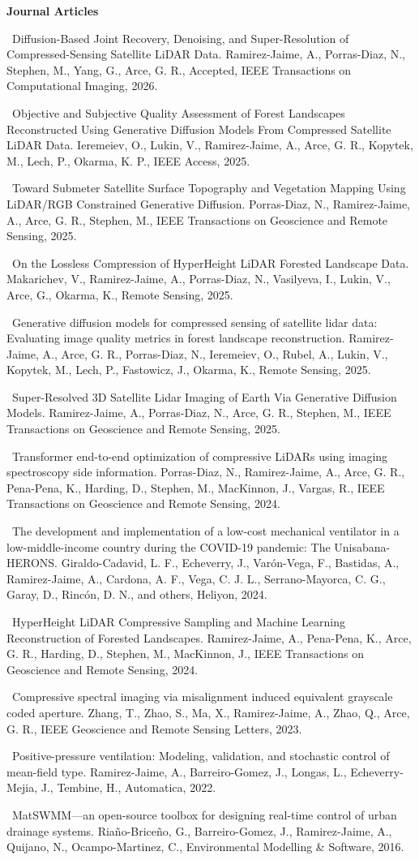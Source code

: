 \documentclass[letterpaper,10pt]{article}
\newcommand{\resumeItem}[1]{\item\small{#1}}
\begin{document}
  \textbf{Journal Articles}
  \resumeItem{\textbullet\ Diffusion-Based Joint Recovery, Denoising, and Super-Resolution of Compressed-Sensing Satellite LiDAR Data. Ramirez-Jaime, A., Porras-Diaz, N., Stephen, M., Yang, G., Arce, G. R., Accepted, IEEE Transactions on Computational Imaging, 2026.}
  \resumeItem{\textbullet\ Objective and Subjective Quality Assessment of Forest Landscapes Reconstructed Using Generative Diffusion Models From Compressed Satellite LiDAR Data. Ieremeiev, O., Lukin, V., Ramirez-Jaime, A., Arce, G. R., Kopytek, M., Lech, P., Okarma, K. P., IEEE Access, 2025.}
  \resumeItem{\textbullet\ Toward Submeter Satellite Surface Topography and Vegetation Mapping Using LiDAR/RGB Constrained Generative Diffusion. Porras-Diaz, N., Ramirez-Jaime, A., Arce, G. R., Stephen, M., IEEE Transactions on Geoscience and Remote Sensing, 2025.}
  \resumeItem{\textbullet\ On the Lossless Compression of HyperHeight LiDAR Forested Landscape Data. Makarichev, V., Ramirez-Jaime, A., Porras-Diaz, N., Vasilyeva, I., Lukin, V., Arce, G., Okarma, K., Remote Sensing, 2025.}
  \resumeItem{\textbullet\ Generative diffusion models for compressed sensing of satellite lidar data: Evaluating image quality metrics in forest landscape reconstruction. Ramirez-Jaime, A., Arce, G. R., Porras-Diaz, N., Ieremeiev, O., Rubel, A., Lukin, V., Kopytek, M., Lech, P., Fastowicz, J., Okarma, K., Remote Sensing, 2025.}
  \resumeItem{\textbullet\ Super-Resolved 3D Satellite Lidar Imaging of Earth Via Generative Diffusion Models. Ramirez-Jaime, A., Porras-Diaz, N., Arce, G. R., Stephen, M., IEEE Transactions on Geoscience and Remote Sensing, 2025.}
  \resumeItem{\textbullet\ Transformer end-to-end optimization of compressive LiDARs using imaging spectroscopy side information. Porras-Diaz, N., Ramirez-Jaime, A., Arce, G. R., Pena-Pena, K., Harding, D., Stephen, M., MacKinnon, J., Vargas, R., IEEE Transactions on Geoscience and Remote Sensing, 2024.}
  \resumeItem{\textbullet\ The development and implementation of a low-cost mechanical ventilator in a low-middle-income country during the COVID-19 pandemic: The Unisabana-HERONS. Giraldo-Cadavid, L. F., Echeverry, J., Var{\'o}n-Vega, F., Bastidas, A., Ramirez-Jaime, A., Cardona, A. F., Vega, C. J. L., Serrano-Mayorca, C. G., Garay, D., Rinc{\'o}n, D. N., and others, Heliyon, 2024.}
  \resumeItem{\textbullet\ HyperHeight LiDAR Compressive Sampling and Machine Learning Reconstruction of Forested Landscapes. Ramirez-Jaime, A., Pena-Pena, K., Arce, G. R., Harding, D., Stephen, M., MacKinnon, J., IEEE Transactions on Geoscience and Remote Sensing, 2024.}
  \resumeItem{\textbullet\ Compressive spectral imaging via misalignment induced equivalent grayscale coded aperture. Zhang, T., Zhao, S., Ma, X., Ramirez-Jaime, A., Zhao, Q., Arce, G. R., IEEE Geoscience and Remote Sensing Letters, 2023.}
  \resumeItem{\textbullet\ Positive-pressure ventilation: Modeling, validation, and stochastic control of mean-field type. Ramirez-Jaime, A., Barreiro-Gomez, J., Longas, L., Echeverry-Mejia, J., Tembine, H., Automatica, 2022.}
  \resumeItem{\textbullet\ MatSWMM---an open-source toolbox for designing real-time control of urban drainage systems. Ria{\~n}o-Brice{\~n}o, G., Barreiro-Gomez, J., Ramirez-Jaime, A., Quijano, N., Ocampo-Martinez, C., Environmental Modelling \& Software, 2016.}
\end{document}

